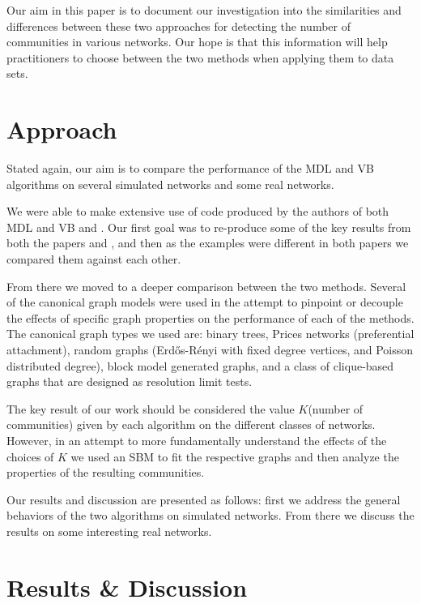\documentclass[twocolumn,twoside]{IEEEtran}
\begin{document}
Our aim in this paper is to document our investigation into the similarities
and differences between these two approaches for detecting the number of
communities in various networks. Our hope is that this information will help practitioners to
choose between the two methods when applying them to data sets.

\section*{Approach}\label{sec:Approach} Stated again, our aim is to compare the
performance of the MDL and VB algorithms on several simulated networks and some
real networks.

We were able to make extensive use of code produced by the authors of both MDL
and VB \cite{peixoto_graph-tool_2014} and \cite{Hofman_python_2008}. Our first
goal was to re-produce some of the key results from both the papers
\cite{Peixoto2013} and \cite{Hofman2008}, and then as the examples were
different in both papers we compared them against each other.

From there we moved to a deeper comparison between the two methods. Several of
the canonical graph models were used in the attempt to pinpoint or decouple
the effects of specific graph properties on the performance of each of the
methods. The canonical graph types we used are: binary trees, Prices networks
(preferential attachment), random graphs (Erd\H{o}s-R\'{e}nyi with fixed degree
vertices, and Poisson distributed degree), block model generated graphs, and a
class of clique-based graphs that are designed as resolution limit tests.

The key result of our work should be considered the value $K$(number of
communities) given by each algorithm on the different classes of networks. However, in an attempt to more
fundamentally understand the effects of the choices of $K$ we used an SBM to
fit the respective graphs and then analyze the properties of the resulting
communities.

Our results and discussion are presented as follows: first we address the
general behaviors of the two algorithms on simulated networks. From there we
discuss the results on some interesting real networks.

\section*{Results \& Discussion}\label{sec:RD}
\end{document}

